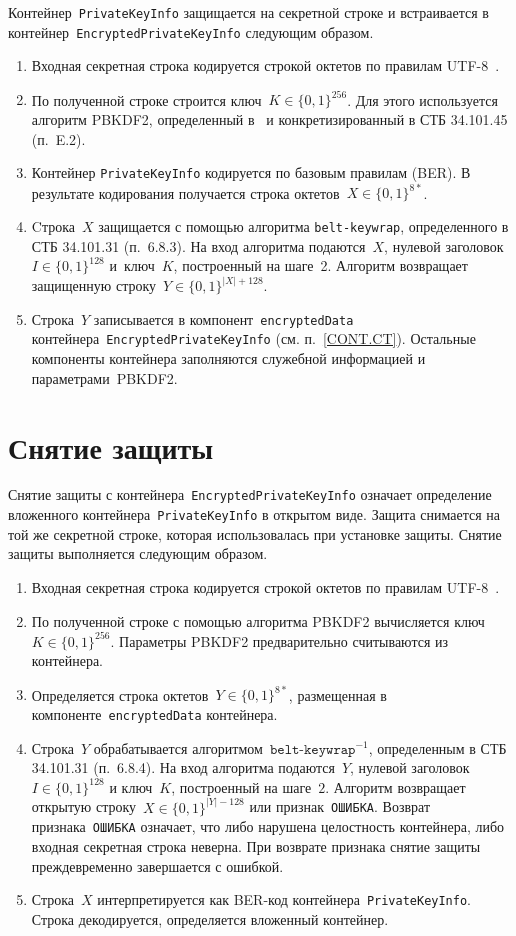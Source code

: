 Контейнер~\texttt{PrivateKeyInfo} защищается на секретной строке и
встраивается в контейнер~\texttt{EncryptedPrivateKeyInfo} следующим
образом.
\begin{enumerate}
\item
Входная секретная строка кодируется строкой октетов по правилам 
UTF-8~\cite{UTF8}. 
\item
По полученной строке строится ключ~$K\in\{0,1\}^{256}$.
Для этого используется алгоритм PBKDF2, определенный в~\cite{PKCS5} и 
конкретизированный в СТБ 34.101.45 (п.~E.2).
\item
Контейнер \texttt{PrivateKeyInfo} кодируется по базовым правилам (BER).
В результате кодирования получается строка октетов~$X\in\{0,1\}^{8*}$.
\item
Cтрока~$X$ защищается с помощью алгоритма \texttt{belt-keywrap}, 
определенного в СТБ 34.101.31 (п.~6.8.3). 
На вход алгоритма подаются~$X$, нулевой заголовок~$I\in\{0,1\}^{128}$
и~ключ~$K$, построенный на шаге~2. Алгоритм возвращает защищенную 
строку~$Y\in\{0,1\}^{|X|+128}$. 
\item
Строка~$Y$ записывается в компонент~\texttt{encryptedData}
контейнера~\texttt{EncryptedPrivateKeyInfo} (см. п.~\ref{CONT.CT}).
Остальные компоненты контейнера
заполняются служебной информацией и параметрами~PBKDF2.
\end{enumerate}

\section{Снятие защиты}\label{CONT.Unwrap}

Снятие защиты с контейнера~\texttt{EncryptedPrivateKeyInfo} 
означает определение вложенного контейнера~\texttt{PrivateKeyInfo} 
в открытом виде. Защита снимается на той же секретной строке, которая 
использовалась при установке защиты. 
Снятие защиты выполняется следующим образом.
\begin{enumerate}
\item
Входная секретная строка кодируется строкой октетов по правилам  
UTF-8~\cite{UTF8}. 
\item
По полученной строке с помощью алгоритма PBKDF2
вычисляется ключ~$K\in\{0,1\}^{256}$.
Параметры PBKDF2 предварительно считываются из контейнера.
\item
Определяется строка октетов~$Y\in\{0,1\}^{8*}$, размещенная в 
компоненте~\texttt{encryptedData} контейнера. 
\item
Строка~$Y$ обрабатывается алгоритмом~$\texttt{belt-keywrap}^{-1}$, определенным 
в СТБ 34.101.31 (п.~6.8.4). На вход алгоритма подаются~$Y$, 
нулевой заголовок~$I\in\{0,1\}^{128}$ и ключ~$K$, построенный на шаге~$2$.
Алгоритм возвращает открытую строку~$X\in\{0,1\}^{|Y|-128}$ или 
признак~\texttt{ОШИБКА}. Возврат признака~\texttt{ОШИБКА} означает, что 
либо нарушена целостность контейнера, либо входная секретная строка неверна.  
При возврате признака снятие защиты преждевременно завершается с ошибкой.
\item
Строка~$X$ интерпретируется как BER-код 
контейнера~\texttt{PrivateKeyInfo}. Строка декодируется, определяется 
вложенный контейнер. 
\end{enumerate}

